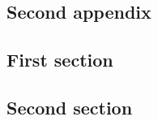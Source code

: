 \documentclass[11pt]{report}
\begin{document}
\begin{appendices}
  \chapter{Second appendix}
  \section{First section}
  \section{Second section}
\end{appendices}


\newpage
\nocite{*}

\end{document}
